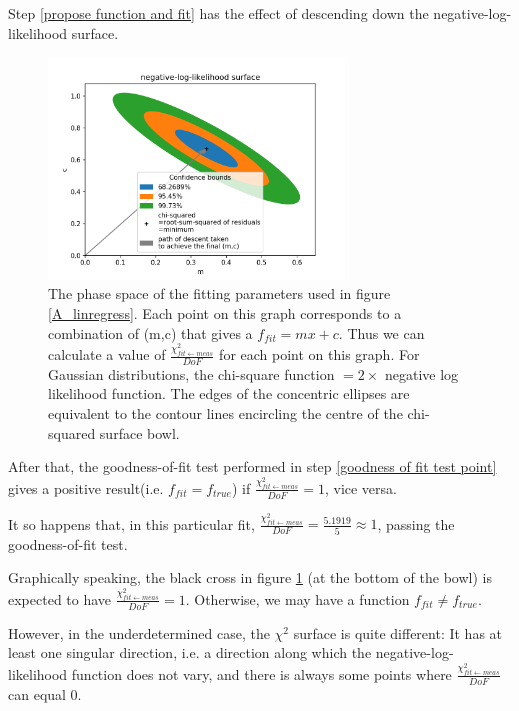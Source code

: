\documentclass[a4paper, 12pt]{article}
\newcommand{\chifit}{\frac{\chi^2_{fit\leftarrow meas}}{DoF} }
\begin{document}
Step \ref{propose function and fit} has the effect of descending down the negative-log-likelihood surface.

\begin{figure}[H]
\centering
\includegraphics[width=0.7\textwidth]{Phase_space.png}
\caption{The phase space of the fitting parameters used in figure \ref{A_linregress}. Each point on this graph corresponds to a combination of (m,c) that gives a $f_{fit}=mx+c$. Thus we can calculate a value of $\chifit$ for each point on this graph.
For Gaussian distributions, the chi-square function $=2\times$ negative log likelihood function. The edges of the concentric ellipses are equivalent to the contour lines encircling the centre of the chi-squared surface bowl.
}\label{Phase_space}
\end{figure}

After that, the goodness-of-fit test performed in step \ref{goodness of fit test point} gives a positive result(i.e. $f_{fit}=f_{true}$) if $\chifit=1$, vice versa. 

It so happens that, in this particular fit, $\chifit=\frac{5.1919}{5}\approx 1$, passing the goodness-of-fit test.

Graphically speaking, the black cross in figure \ref{Phase_space} (at the bottom of the bowl) is expected to have $\chifit=1$. Otherwise, we may have a function $f_{fit}\neq f_{true}$.

However, in the underdetermined case, the $\chi^2$ surface is quite different: It has at least one singular direction, i.e. a direction along which the negative-log-likelihood function does not vary, and there is always some points where $\chifit$ can equal 0.
\end{document}
